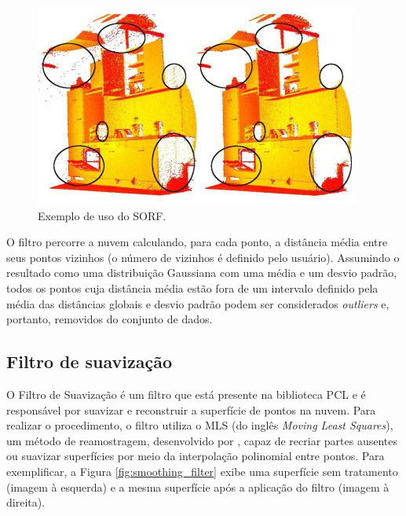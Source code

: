 \begin{figure}[H]
    \centering
    \includegraphics[scale=0.6]{dados/figuras/outlier_filter.jpg}
    \caption{Exemplo de uso do SORF.}
    \vspace{-0.8em}
    \label{fig:outlier_filter}
\end{figure}

O filtro percorre a nuvem calculando, para cada ponto, a distância média entre seus pontos vizinhos (o número de vizinhos é definido pelo usuário). Assumindo o resultado como uma distribuição Gaussiana com uma média e um desvio padrão, todos os pontos cuja distância média estão fora de um intervalo definido pela média das distâncias globais e desvio padrão podem ser considerados \textit{outliers} e, portanto, removidos do conjunto de dados.

\subsection{Filtro de suavização}
\label{sec:smoothing_filter}

O Filtro de Suavização é um filtro que está presente na biblioteca PCL e é responsável por suavizar e reconstruir a superfície de pontos na nuvem. 
Para realizar o procedimento, o filtro utiliza o MLS (do inglês \textit{Moving Least Squares}), um método de reamostragem, desenvolvido por \cite{levin1998mls}, capaz de recriar partes ausentes ou suavizar superfícies por meio da interpolação polinomial entre pontos. 
Para exemplificar, a Figura \ref{fig:smoothing_filter} exibe uma superfície sem tratamento (imagem à esquerda) e a mesma superfície após a aplicação do filtro (imagem à direita).

